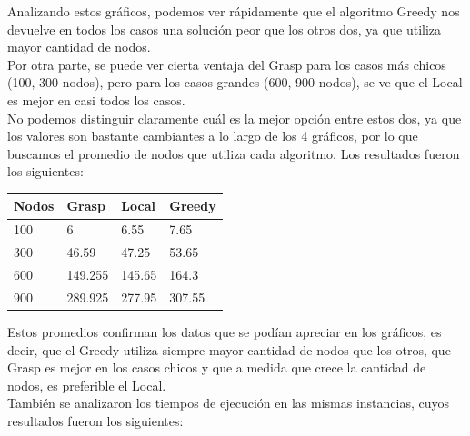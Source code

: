 Analizando estos gr\'aficos, podemos ver r\'apidamente que el algoritmo Greedy nos devuelve en todos los casos una soluci\'on peor que los otros dos, ya que utiliza mayor cantidad de nodos.\\
Por otra parte, se puede ver cierta ventaja del Grasp para los casos m\'as chicos (100, 300 nodos), pero para los casos grandes (600, 900 nodos), se ve que el Local es mejor en casi todos los casos.\\

No podemos distinguir claramente cu\'al es la mejor opci\'on entre estos dos, ya que los valores son bastante cambiantes a lo largo de los 4 gr\'aficos, por lo que buscamos el promedio de nodos que utiliza
cada algoritmo. Los resultados fueron los siguientes:\\

\begin{tabular}{| l | l | l | l |}
   \hline
   Nodos & Grasp & Local & Greedy\\ \hline
   100 & 6 & 6.55 & 7.65 \\ \hline
   300 & 46.59 & 47.25 & 53.65 \\ \hline
   600 & 149.255 & 145.65 & 164.3 \\ \hline
   900 & 289.925 & 277.95 & 307.55 \\
   \hline
\end{tabular}

Estos promedios confirman los datos que se pod\'ian apreciar en los gr\'aficos, es decir, que el Greedy utiliza siempre mayor cantidad de nodos que los otros, que Grasp es mejor en los casos chicos y
que a medida que crece la cantidad de nodos, es preferible el Local.\\

También se analizaron los tiempos de ejecución en las mismas instancias, cuyos resultados fueron los siguientes:

